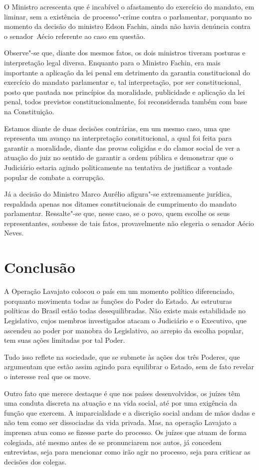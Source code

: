{O Ministro acrescenta que é incabível o afastamento do exercício do
mandato, em liminar, sem a existência~de processo"-crime contra o
parlamentar, porquanto no momento da decisão do ministro Edson Fachin,
ainda não havia denúncia contra o senador~Aécio referente ao caso em
questão.

Observe"-se que, diante dos mesmos fatos, os dois ministros tiveram
posturas e interpretação legal diversa. Enquanto para o Ministro Fachin,
era mais importante a aplicação da lei penal em detrimento da garantia
constitucional do exercício do mandato parlamentar e, tal interpretação,
por ser constitucional, posto que pautada nos princípios da moralidade,
publicidade e aplicação da lei penal, todos previstos
constitucionalmente, foi reconsiderada também com base na Constituição.

Estamos diante de duas decisões contrárias, em um mesmo caso, uma que
representa um avanço na interpretação constitucional, a qual foi feita
para garantir a moralidade, diante das provas coligidas e do clamor
social de ver a atuação do juiz no sentido de garantir a ordem pública e
demonstrar que o Judiciário estaria agindo politicamente na tentativa de
justificar a vontade popular de combate a corrupção.

Já a decisão do Ministro Marco Aurélio afigura"-se extremamente jurídica,
respaldada apenas nos ditames constitucionais de cumprimento do mandato
parlamentar. Ressalte"-se que, nesse caso, se o povo, quem escolhe os
seus representantes, soubesse de tais fatos, provavelmente não elegeria
o senador Aécio Neves.

\section{Conclusão}

A Operação Lavajato colocou o país em um momento político diferenciado,
porquanto movimenta todas as funções do Poder do Estado. As estruturas
políticas do Brasil estão todas desequilibradas. Não existe mais
estabilidade no Legislativo, cujos membros investigados atacam o
Judiciário e o Executivo, que ascendeu ao poder por manobra do
Legislativo, ao arrepio da escolha popular, tem suas ações limitadas por
tal Poder.

Tudo isso reflete na sociedade, que se submete às ações dos três
Poderes, que argumentam que estão assim agindo para equilibrar o Estado,
sem de fato revelar o interesse real que os move.

Outro fato que merece destaque é que nos países desenvolvidos, os juízes
têm uma conduta discreta na atuação e na vida social, até por uma
exigência da função que exercem. A imparcialidade e a discrição social
andam de mãos dadas e não tem como ser dissociadas da vida privada. Mas,
na operação Lavajato a imprensa atua como se fizesse parte do processo.
Os juízes que atuam de forma colegiada, até mesmo antes de se
pronunciarem nos autos, já concedem entrevistas, seja para mencionar
como irão agir no processo, seja para criticar as decisões dos colegas.

}

